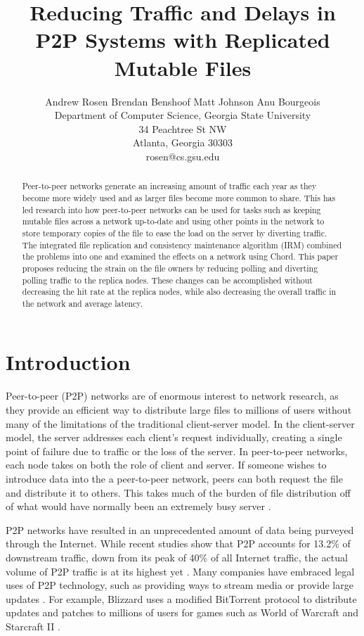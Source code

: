 \documentclass[10pt, conference, compsocconf, letterpaper]{IEEEtran} %
\title{Reducing Traffic and Delays in P2P Systems with Replicated Mutable Files}
\author{
Andrew Rosen \qquad Brendan Benshoof \qquad Matt Johnson \qquad Anu Bourgeois  \\Department of Computer Science, Georgia State University\\ 34 Peachtree St NW \\ Atlanta, Georgia 30303\\  rosen@cs.gsu.edu }
\begin{document}
\maketitle

\begin{abstract}
Peer-to-peer networks generate an increasing amount of traffic each year as they become more widely used and as larger files become more common to share. This has led research into how peer-to-peer networks can be used for tasks such as keeping mutable files across a network up-to-date and using other points in the network to store temporary copies of the file to ease the load on the server by diverting traffic. The integrated file replication and consistency maintenance algorithm (IRM) combined the problems into one and examined the effects on a network using Chord. This paper proposes reducing the strain on the file owners by reducing polling and diverting  polling traffic to the replica nodes.  These changes can be accomplished without decreasing the hit rate at the replica nodes, while also decreasing the overall traffic in the network and average latency.
\end{abstract}



\section{Introduction}
Peer-to-peer (P2P) networks are of enormous interest to network research, as they provide an efficient way to distribute large files to millions of users without many of the limitations of the traditional client-server model. In the client-server model, the server addresses each client's request individually, creating a single point of failure due to traffic or the loss of the server.  In peer-to-peer networks, each node takes on both the role of client and server.  If someone wishes to introduce data into the a peer-to-peer network, peers can both request the file and distribute it to others.  This takes much of the burden of file distribution off of what would have normally been an extremely busy server \cite{Overview}.

P2P networks have resulted in an unprecedented amount of data being purveyed through the Internet.  While recent studies show that P2P accounts for 13.2\% of downstream traffic, down from its peak of 40\% of all Internet traffic, the actual volume of P2P traffic is at its highest yet \cite{5713296}. Many companies have embraced legal uses of P2P technology, such as providing ways to stream media or provide large updates  \cite{P2PLegal}.  For example, Blizzard uses a modified BitTorrent protocol to distribute updates and patches to millions of users for games such as World of Warcraft and Starcraft II \cite{chehai2006analysis}.
\end{document}

